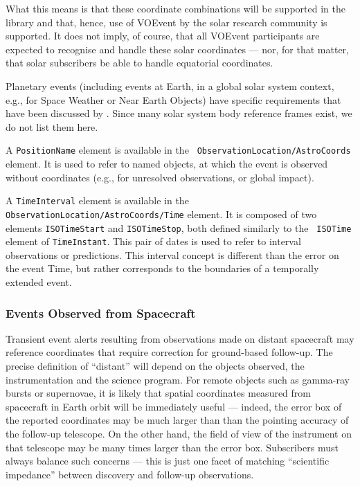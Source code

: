 \documentclass[11pt,a4paper]{ivoa}
\begin{document}
What this means is that these coordinate combinations will be supported in the
library and that, hence, use of VOEvent by the solar research community is
supported. It does not imply, of course, that all VOEvent participants are
expected to recognise and handle these solar coordinates --- nor, for that
matter, that solar subscribers be able to handle equatorial coordinates.

Planetary events (including events at Earth, in a global solar system context,
e.g., for Space Weather or Near Earth Objects) have specific requirements that 
have been discussed by \citet{2018arXiv181112680C}. Since many solar system body 
reference frames exist, we do not list them here. 

A \texttt{PositionName} element is available in the \texttt{
ObservationLocation/AstroCoords} element. It is used to refer to named objects, 
at which the event is observed without coordinates (e.g., for unresolved 
observations, or global impact).  

A \texttt{TimeInterval} element is available in the \texttt{
ObservationLocation/AstroCoords/Time} element. It is composed of two elements 
\texttt{ISOTimeStart} and \texttt{ISOTimeStop}, both defined similarly to the \texttt{
ISOTime} element of \texttt{TimeInstant}. This pair of dates is used to refer to 
interval observations or predictions. This interval concept is different than 
the error on the event Time, but rather corresponds to the boundaries of a 
temporally extended event. 

\subsubsection{Events Observed from Spacecraft}
\label{sec:3.4.5}
Transient event alerts resulting from observations made on distant spacecraft
may reference coordinates that require correction for ground-based follow-up.
The precise definition of ``distant'' will depend on the objects observed, the
instrumentation and the science program. For remote objects such as gamma-ray
bursts or supernovae, it is likely that spatial coordinates measured from
spacecraft in Earth orbit will be immediately useful --- indeed, the error box
of the reported coordinates may be much larger than than the pointing accuracy
of the follow-up telescope. On the other hand, the field of view of the
instrument on that telescope may be many times larger than the error box.
Subscribers must always balance such concerns --- this is just one facet of
matching ``scientific impedance'' between discovery and follow-up observations.
\end{document}
